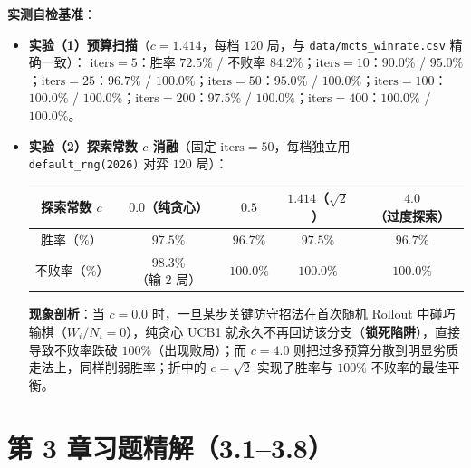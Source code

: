 \textbf{实测自检基准}：
\begin{itemize}
  \item \textbf{实验（1）预算扫描}（$c=1.414$，每档 $120$ 局，与 \texttt{data/mcts\_winrate.csv} 精确一致）：
  $\text{iters}=5$：胜率 $\mathbf{72.5\%}$ / 不败率 $84.2\%$；$\text{iters}=10$：$90.0\%$ / $95.0\%$；$\text{iters}=25$：$96.7\%$ / $\mathbf{100.0\%}$；$\text{iters}=50$：$95.0\%$ / $100.0\%$；$\text{iters}=100$：$\mathbf{100.0\%}$ / $100.0\%$；$\text{iters}=200$：$97.5\%$ / $100.0\%$；$\text{iters}=400$：$\mathbf{100.0\%}$ / $100.0\%$。
  \item \textbf{实验（2）探索常数 $c$ 消融}（固定 $\text{iters}=50$，每档独立用 \texttt{default\_rng(2026)} 对弈 $120$ 局）：
  \begin{center}
  \small
  \begin{tabular}{@{}ccccc@{}}
  \toprule
  \textbf{探索常数 $c$} & $0.0$（纯贪心） & $0.5$ & $1.414$（$\sqrt{2}$） & $4.0$（过度探索） \\
  \midrule
  胜率（\%） & $97.5\%$ & $96.7\%$ & $\mathbf{97.5\%}$ & $96.7\%$ \\
  不败率（\%） & $\mathbf{98.3\%}$（输 2 局） & $100.0\%$ & $\mathbf{100.0\%}$ & $100.0\%$ \\
  \bottomrule
  \end{tabular}
  \end{center}
  \textbf{现象剖析}：当 $c=0.0$ 时，一旦某步关键防守招法在首次随机 Rollout 中碰巧输棋（$W_i/N_i = 0$），纯贪心 UCB1 就永久不再回访该分支（\textbf{锁死陷阱}），直接导致不败率跌破 $100\%$（出现败局）；而 $c=4.0$ 则把过多预算分散到明显劣质走法上，同样削弱胜率；折中的 $c=\sqrt{2}$ 实现了胜率与 $100\%$ 不败率的最佳平衡。
\end{itemize}

\section{第 3 章习题精解（3.1--3.8）}

